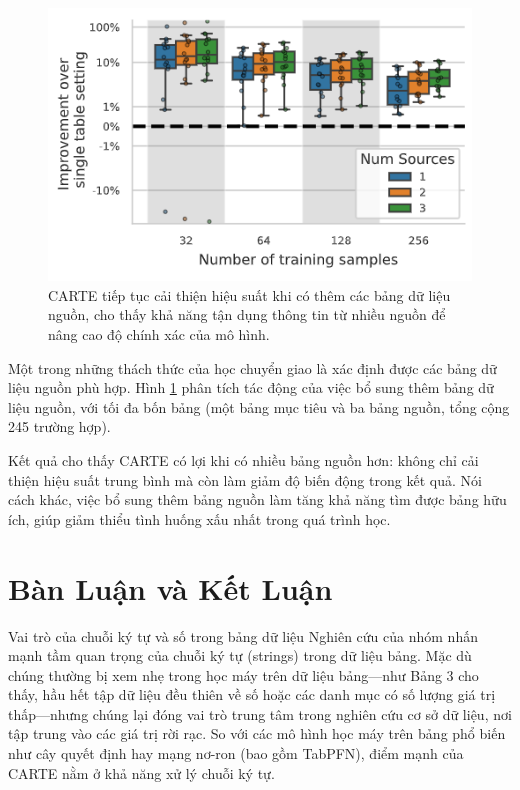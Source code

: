 \documentclass{article}
\begin{document}
\begin{figure} 
    \centering
    \includegraphics[scale = 0.8]{carte_benefits_from_additional_source_tables.png}
    \caption{CARTE tiếp tục cải thiện hiệu suất khi có thêm các bảng dữ liệu nguồn, cho thấy khả năng tận dụng thông tin từ nhiều nguồn để nâng cao độ chính xác của mô hình.}
    \label{fig:carte_benefits_from_additional_source_tables}
\end{figure}

Một trong những thách thức của học chuyển giao là xác định được các bảng dữ liệu nguồn phù hợp. Hình \ref{fig:carte_benefits_from_additional_source_tables} phân tích tác động của việc bổ sung thêm bảng dữ liệu nguồn, với tối đa bốn bảng (một bảng mục tiêu và ba bảng nguồn, tổng cộng 245 trường hợp).

Kết quả cho thấy CARTE có lợi khi có nhiều bảng nguồn hơn: không chỉ cải thiện hiệu suất trung bình mà còn làm giảm độ biến động trong kết quả. Nói cách khác, việc bổ sung thêm bảng nguồn làm tăng khả năng tìm được bảng hữu ích, giúp giảm thiểu tình huống xấu nhất trong quá trình học.

\section{Bàn Luận và Kết Luận}
Vai trò của chuỗi ký tự và số trong bảng dữ liệu
Nghiên cứu của nhóm nhấn mạnh tầm quan trọng của chuỗi ký tự (strings) trong dữ liệu bảng. Mặc dù chúng thường bị xem nhẹ trong học máy trên dữ liệu bảng—như Bảng 3 cho thấy, hầu hết tập dữ liệu đều thiên về số hoặc các danh mục có số lượng giá trị thấp—nhưng chúng lại đóng vai trò trung tâm trong nghiên cứu cơ sở dữ liệu, nơi tập trung vào các giá trị rời rạc. So với các mô hình học máy trên bảng phổ biến như cây quyết định hay mạng nơ-ron (bao gồm TabPFN), điểm mạnh của CARTE nằm ở khả năng xử lý chuỗi ký tự.
\end{document}
